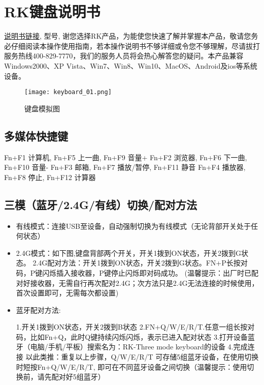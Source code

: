 \section{RK键盘说明书}
\href{http://www.rkgaming.com/zh-CN/article.php?id=115}{说明书链接}, 型号, 谢您选择RK产品，为能使您快速了解并掌握本产品，敬请您务必仔细阅读本操作使用指南，若本操作说明书不够详细或令您不够理解，尽请拔打服务热线400-829-7770，我们的服务人员将会热心解答您的疑问。本产品兼容 Windows2000、XP Vista、Win7、Win8、Win10、MacOS、Android及ios等系统设备。
\begin{figure}[H]
\centering
\texttt{[image: keyboard\_01.png]}
\caption{键盘模拟图}
\end{figure}

\subsection{多媒体快捷键}
\begin{messagebox}
Fn+F1 计算机, Fn+F5 上一曲, Fn+F9 音量+
Fn+F2 浏览器, Fn+F6 下一曲, Fn+F10 音量-
Fn+F3 邮箱, Fn+F7 播放/暂停, Fn+F11 静音
Fn+F4 播放器, Fn+F8 停止, Fn+F12 计算器
\end{messagebox}

\subsection{三模（蓝牙/2.4G/有线）切换/配对方法}
\begin{itemize}
\item 有线模式：连接USB至设备，自动强制切换为有线模式（无论背部开关处于任何状态）
\item 2.4G模式：如下图,键盘背部两个开关，开关1拨到ON状态，开关2拨到G状态。
2.4G配对方法：开关1拨到ON状态，开关2拨到G状态。FN+P长按对码，P键闪烁插入接收器，P键停止闪烁即对码成功。
(温馨提示：出厂时已配对好接收器，无需自行再次配对2.4G；次方法只是2.4G无法连接的时候使用，首次设置即可，无需每次都设置)
\item 蓝牙配对方法:
\begin{messagebox}
1.开关1拨到ON状态，开关2拨到B状态
2.FN+Q/W/E/R/T.任意一组长按对码，比如Fn+Q，此时Q键持续闪烁闪烁，表示已进入配对状态
3.打开设备蓝牙（电脑/手机/平板）搜索名为：RK-Three mode keyboard的设备
4.完成连接
以此类推：重复以上步骤，Q/W/E/R/T 可存储5组蓝牙设备，在使用切换时短按Fn+Q/W/E/R/T,
即可在不同蓝牙设备之间切换（温馨提示：使用切换前，请先配对好5组蓝牙）
\end{messagebox}
\end{itemize}

